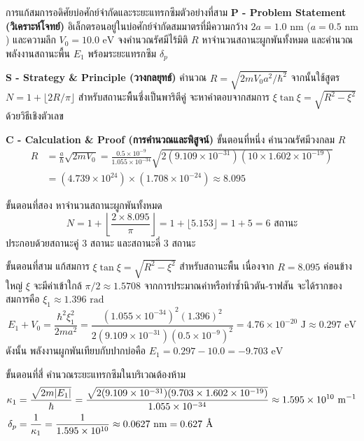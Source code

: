 \begin{psctbox}{การแก้สมการอดิศัยบ่อศักย์จำกัดและระยะแทรกซึม}{ตัวอย่างที่สาม}
\noindent\textbf{P - Problem Statement (วิเคราะห์โจทย์)} อิเล็กตรอนอยู่ในบ่อศักย์จำกัดสมมาตรที่มีความกว้าง $2a = 1.0\text{ nm}$ ($a = 0.5\text{ nm}$) และความลึก $V_0 = 10.0\text{ eV}$ จงคำนวณรัศมีไร้มิติ $R$ หาจำนวนสถานะผูกพันทั้งหมด และคำนวณพลังงานสถานะพื้น $E_1$ พร้อมระยะแทรกซึม $\delta_p$

\vspace{6pt}
\noindent\textbf{S - Strategy \& Principle (วางกลยุทธ์)} คำนวณ $R = \sqrt{2m V_0 a^2/\hbar^2}$ จากนั้นใช้สูตร $N = 1 + \lfloor 2R/\pi \rfloor$ สำหรับสถานะพื้นซึ่งเป็นพาริตีคู่ จะหาคำตอบจากสมการ $\xi\tan\xi = \sqrt{R^2 - \xi^2}$ ด้วยวิธีเชิงตัวเลข

\vspace{6pt}
\noindent\textbf{C - Calculation \& Proof (การคำนวณและพิสูจน์)}
ขั้นตอนที่หนึ่ง คำนวณรัศมีวงกลม $R$
\begin{align}
R &= \frac{a}{\hbar} \sqrt{2m V_0} = \frac{0.5 \times 10^{-9}}{1.055 \times 10^{-34}} \sqrt{2(9.109 \times 10^{-31})(10 \times 1.602 \times 10^{-19})} \\
&= (4.739 \times 10^{24}) \times (1.708 \times 10^{-24}) \approx 8.095
\end{align}

ขั้นตอนที่สอง หาจำนวนสถานะผูกพันทั้งหมด
\begin{equation}
N = 1 + \left\lfloor \frac{2 \times 8.095}{\pi} \right\rfloor = 1 + \lfloor 5.153 \rfloor = 1 + 5 = 6 \text{ สถานะ}
\end{equation}
ประกอบด้วยสถานะคู่ 3 สถานะ และสถานะคี่ 3 สถานะ

ขั้นตอนที่สาม แก้สมการ $\xi\tan\xi = \sqrt{R^2 - \xi^2}$ สำหรับสถานะพื้น
เนื่องจาก $R = 8.095$ ค่อนข้างใหญ่ $\xi$ จะมีค่าเข้าใกล้ $\pi/2 \approx 1.5708$ จากการประมาณค่าหรือทำซ้ำนิวตัน-ราฟสัน จะได้รากของสมการคือ $\xi_1 \approx 1.396\text{ rad}$
\begin{equation}
E_1 + V_0 = \frac{\hbar^2 \xi_1^2}{2m a^2} = \frac{(1.055 \times 10^{-34})^2 (1.396)^2}{2(9.109 \times 10^{-31})(0.5 \times 10^{-9})^2} = 4.76 \times 10^{-20}\text{ J} \approx 0.297\text{ eV}
\end{equation}
ดังนั้น พลังงานผูกพันเทียบกับปากบ่อคือ $E_1 = 0.297 - 10.0 = -9.703\text{ eV}$

ขั้นตอนที่สี่ คำนวณระยะแทรกซึมในบริเวณต้องห้าม
\begin{align}
\kappa_1 &= \frac{\sqrt{2m|E_1|}}{\hbar} = \frac{\sqrt{2(9.109 \times 10^{-31})(9.703 \times 1.602 \times 10^{-19})}}{1.055 \times 10^{-34}} \approx 1.595 \times 10^{10}\text{ m}^{-1} \\
\delta_p &= \frac{1}{\kappa_1} = \frac{1}{1.595 \times 10^{10}} \approx 0.0627\text{ nm} = 0.627\text{ \r{A}}
\end{align}


\end{psctbox}
